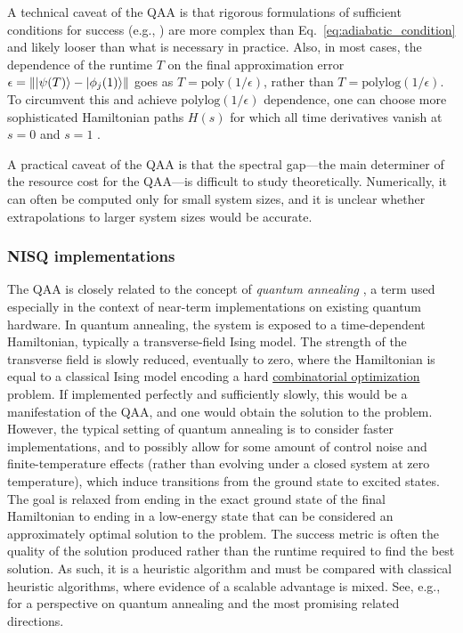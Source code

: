 \begin{refsection}
A technical caveat of the QAA is that rigorous formulations of sufficient conditions for success (e.g., \cite{jansen2007BoundsAdiabaticApproximation,elgart2012SwitchingAdiabaticTheorem}) are more complex than Eq.~\eqref{eq:adiabatic_condition} and likely looser than what is necessary in practice. Also, in most cases, the dependence of the runtime $T$ on the final approximation error $\epsilon = \lVert \lvert\psi(T)\rangle-\lvert\phi_j(1)\rangle\rVert$ goes as $T = \mathrm{poly}(1/\epsilon)$, rather than $T = \mathrm{polylog}(1/\epsilon)$. To circumvent this and achieve $\mathrm{polylog}(1/\epsilon)$ dependence, one can choose more sophisticated Hamiltonian paths $H(s)$ for which all time derivatives vanish at $s=0$ and $s=1$ \cite{ge2016rapidAdiabaticPrep,albash2018AQCreview}.

A practical caveat of the QAA is that the spectral gap---the main determiner of the resource cost for the QAA---is difficult to study theoretically. Numerically, it can often be computed only for small system sizes, and it is unclear whether extrapolations to larger system sizes would be accurate.

\subsubsection*{NISQ implementations}

The QAA is closely related to the concept of \emph{quantum annealing} \cite{kadowaki1998Annealing}, a term used especially in the context of near-term implementations on existing quantum hardware. In quantum annealing, the system is exposed to a time-dependent Hamiltonian, typically a transverse-field Ising model. The strength of the transverse field is slowly reduced, eventually to zero, where the Hamiltonian is equal to a classical Ising model encoding a hard \hyperref[appl:CombOpt]{combinatorial optimization} problem. If implemented perfectly and sufficiently slowly, this would be a manifestation of the QAA, and one would obtain the solution to the problem. However, the typical setting of quantum annealing is to consider faster implementations, and to possibly allow for some amount of control noise and finite-temperature effects (rather than evolving under a closed system at zero temperature), which induce transitions from the ground state to excited states. The goal is relaxed from ending in the exact ground state of the final Hamiltonian to ending in a low-energy state that can be considered an approximately optimal solution to the problem. The success metric is often the quality of the solution produced rather than the runtime required to find the best solution. As such, it is a heuristic algorithm and must be compared with classical heuristic algorithms, where evidence of a scalable advantage is mixed. See, e.g.,~\cite{crosson2021prospects} for a perspective on quantum annealing and the most promising related directions. 


\end{refsection}
